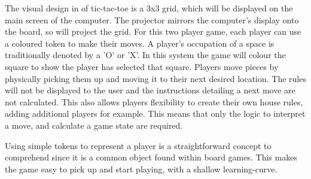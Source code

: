 \documentclass[12pt]{article}
\begin{document}
The visual design in of tic-tac-toe is a 3x3 grid, which will be displayed on the main screen of the computer.
The projector mirrors the computer's display onto the board, so will project the grid. 
For this two player game, each player can use a coloured token to make their moves. 
A player's occupation of a space is traditionally denoted by a 'O' or 'X'. In this system the game will colour the square to show the player has selected that square. 
Players move pieces by physically picking them up and moving it to their next desired location. 
The rules will not be displayed to the user and the instructions detailing a next move are not calculated. 
This also allows players flexibility to create their own house rules, adding additional players for example.
This means that only the logic to interpret a move, and calculate a game state are required. 

Using simple tokens to represent a player is a straightforward concept to comprehend since it is a common object found within board games. 
This makes the game easy to pick up and start playing, with a shallow learning-curve. 
\end{document}
